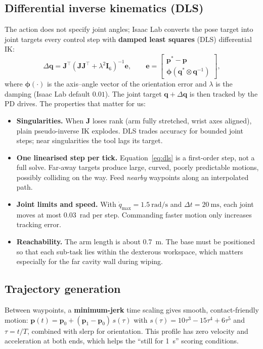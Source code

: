 \documentclass[10pt,a4paper]{article}
\newcommand{\T}{^{\!\top}}
\begin{document}
\subsection{Differential inverse kinematics (DLS)}
The action does not specify joint angles; Isaac Lab converts the pose target into joint targets every control step with \textbf{damped least squares} (DLS) differential IK:
\begin{equation}
\Delta\bm q=\bm J\T\left(\bm J\bm J\T+\lambda^2\bm I_6\right)^{-1}\bm e,\qquad
\bm e=\begin{bmatrix}\bm p^\ast-\bm p\\ \bm\phi(\bm q^\ast\otimes\bm q^{-1})\end{bmatrix},
\label{eq:dls}
\end{equation}
where $\bm\phi(\cdot)$ is the axis--angle vector of the orientation error and $\lambda$ is the damping (Isaac Lab default $0.01$). The joint target $\bm q+\Delta\bm q$ is then tracked by the PD drives. The properties that matter for us:
\begin{itemize}
\item \textbf{Singularities.} When $\bm J$ loses rank (arm fully stretched, wrist axes aligned), plain pseudo-inverse IK explodes. DLS trades accuracy for bounded joint steps; near singularities the tool lags its target.
\item \textbf{One linearised step per tick.} Equation~\eqref{eq:dls} is a first-order step, not a full solve. Far-away targets produce large, curved, poorly predictable motions, possibly colliding on the way. Feed \emph{nearby} waypoints along an interpolated path.
\item \textbf{Joint limits and speed.} With $\dot q_{\max}=\SI{1.5}{\radian\per\second}$ and $\Delta t=\SI{20}{\milli\second}$, each joint moves at most \SI{0.03}{\radian} per step. Commanding faster motion only increases tracking error.
\item \textbf{Reachability.} The arm length is about \SI{0.7}{\metre}. The base must be positioned so that each sub-task lies within the dexterous workspace, which matters especially for the far cavity wall during wiping.
\end{itemize}

\subsection{Trajectory generation}
Between waypoints, a \textbf{minimum-jerk} time scaling gives smooth, contact-friendly motion: $\bm p(t)=\bm p_0+(\bm p_1-\bm p_0)\,s(\tau)$ with $s(\tau)=10\tau^3-15\tau^4+6\tau^5$ and $\tau=t/T$, combined with slerp for orientation. This profile has zero velocity and acceleration at both ends, which helps the ``still for \SI{1}{\second}'' scoring conditions.
\end{document}
